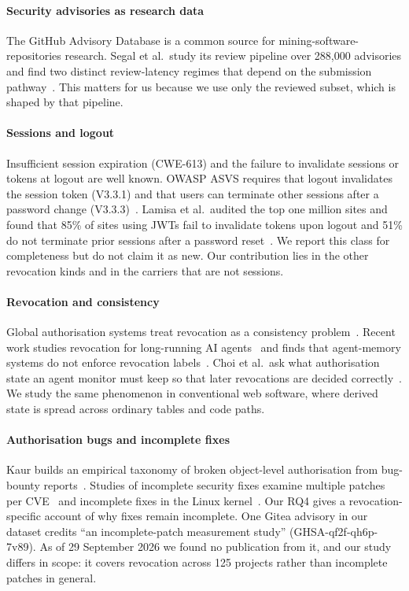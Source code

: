 \documentclass[preprint,12pt]{elsarticle}
\begin{document}
\paragraph{Security advisories as research data}
The GitHub Advisory Database is a common source for mining-software-repositories research. Segal et al.\ study
its review pipeline over 288{,}000 advisories and find two distinct review-latency regimes that depend on
the submission pathway~\cite{segal2026ghsareview}. This matters for us because we use only the reviewed subset,
which is shaped by that pipeline.

\paragraph{Sessions and logout}
Insufficient session expiration (CWE-613) and the failure to invalidate sessions or tokens at logout are
well known. OWASP ASVS requires that logout invalidates the session token (V3.3.1) and that users can terminate other sessions after a password change (V3.3.3)~\cite{owaspasvs}. Lamisa et al.\ audited the top one
million sites and found that 85\% of sites using JWTs fail to invalidate tokens upon logout and 51\% do not
terminate prior sessions after a password reset~\cite{loginplus}. We report this class for
completeness but do not claim it as new. Our contribution lies in the other revocation kinds and in the
carriers that are not sessions.

\paragraph{Revocation and consistency}
Global authorisation systems treat revocation as a consistency problem~\cite{pang2019zanzibar}. Recent work
studies revocation for long-running AI agents~\cite{zhu2026agentrevocation} and finds that agent-memory
systems do not enforce revocation labels~\cite{shen2026agentmemory}. Choi et al.\ ask what authorisation state an agent monitor must keep so that later revocations are decided correctly~\cite{choi2026residualauth}. We study the same phenomenon in
conventional web software, where derived state is spread across ordinary tables and code paths.

\paragraph{Authorisation bugs and incomplete fixes}
Kaur builds an empirical taxonomy of broken object-level authorisation from bug-bounty reports~\cite{kaur2026bola}.
Studies of incomplete security fixes examine multiple patches per CVE~\cite{zhang2026multipatch} and
incomplete fixes in the Linux kernel~\cite{liu2025kernelincomplete}. Our RQ4 gives a
revocation-specific account of why fixes remain incomplete.
One Gitea advisory in our dataset credits ``an incomplete-patch measurement study'' (GHSA-qf2f-qh6p-7v89). As of 29 September 2026 we found no publication from it, and our study differs in scope: it covers revocation across 125 projects rather than incomplete patches in general.
\end{document}
